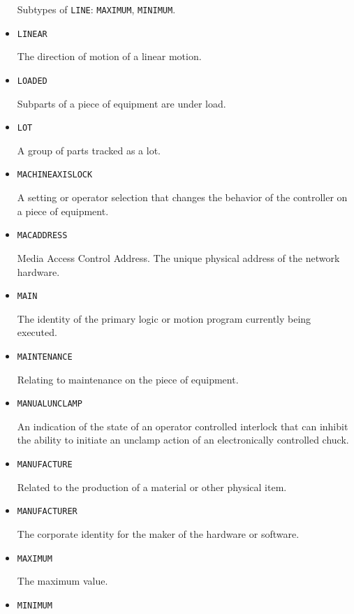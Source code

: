 \begin{itemize}
Subtypes of \texttt{LINE}: \texttt{MAXIMUM}, \texttt{MINIMUM}.

\item \texttt{LINEAR}  

The direction of motion of a linear motion.


\item \texttt{LOADED}  

Subparts of a piece of equipment are under load.


\item \texttt{LOT}  

A group of parts tracked as a lot.


\item \texttt{MACHINE\textunderscore AXIS\textunderscore LOCK}  

A setting or operator selection that changes the behavior of the controller on a piece of equipment.


\item \texttt{MAC\textunderscore ADDRESS}  

Media Access Control Address. The unique physical address of the network hardware.


\item \texttt{MAIN}  

The identity of the primary logic or motion program currently being executed.


\item \texttt{MAINTENANCE}  

Relating to maintenance on the piece of equipment.


\item \texttt{MANUAL\textunderscore UNCLAMP}  

An indication of the state of an operator controlled interlock that can inhibit the ability to initiate an unclamp action of an electronically controlled chuck.


\item \texttt{MANUFACTURE}  

Related to the production of a material or other physical item.


\item \texttt{MANUFACTURER}  

The corporate identity for the maker of the hardware or software.


\item \texttt{MAXIMUM}  

The maximum value.


\item \texttt{MINIMUM}  


\end{itemize}
